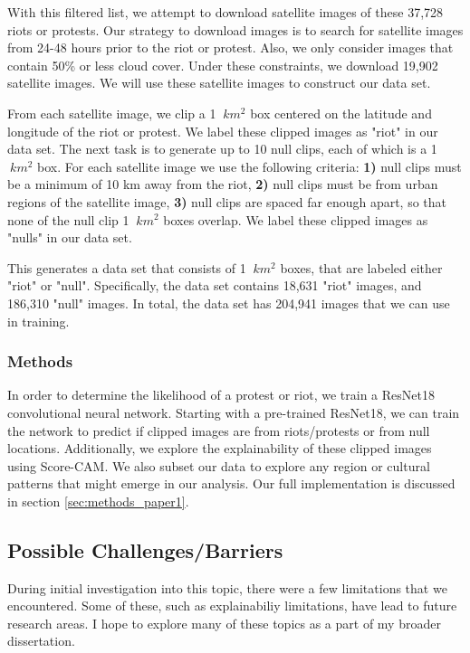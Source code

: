 With this filtered list, we attempt to download satellite images of these 37,728 riots or protests.  Our strategy to download images is to search for satellite images from 24-48 hours prior to the riot or protest.  Also, we only consider images that contain 50\% or less cloud cover.  Under these constraints, we download 19,902 satellite images.  We will use these satellite images to construct our data set.

From each satellite image, we clip a 1 \textit{$\ km^{2}$} box centered on the latitude and longitude of the riot or protest.  We label these clipped images as "riot" in our data set.  The next task is to generate up to 10 null clips, each of which is a 1 \textit{$\ km^{2}$} box.  For each satellite image we use the following criteria: \textbf{1)} null clips must be a minimum of 10 km away from the riot, \textbf{2)} null clips must be from urban regions of the satellite image, \textbf{3)} null clips are spaced far enough apart, so that none of the null clip 1 \textit{$\ km^{2}$} boxes overlap.  We label these clipped images as "nulls" in our data set.

This generates a data set that consists of 1 \textit{$\ km^{2}$} boxes, that are labeled either "riot" or "null".  Specifically, the data set contains 18,631 "riot" images, and 186,310 "null" images.  In total, the data set has 204,941 images that we can use in training.


\subsubsection{Methods}
In order to determine the likelihood of a protest or riot, we train a ResNet18 convolutional neural network.  Starting with a pre-trained ResNet18, we can train the network to predict if clipped images are from riots/protests or from null locations.  Additionally, we explore the explainability of these clipped images using Score-CAM.  We also subset our data to explore any region or cultural patterns that might emerge in our analysis.   Our full implementation is discussed in section \ref{sec:methods_paper1}.


\subsection{Possible Challenges/Barriers}
During initial investigation into this topic, there were a few limitations that we encountered.  Some of these, such as explainabiliy limitations, have lead to future research areas.  I hope to explore many of these topics as a part of my broader dissertation.


